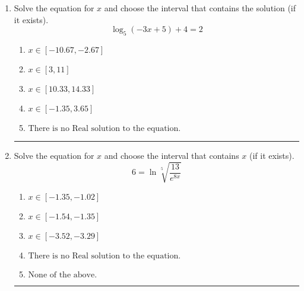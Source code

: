 \documentclass[14pt]{extbook}
\newcommand{\litem}[1]{\item#1\hspace*{-1cm}\rule{\textwidth}{0.4pt}}
\begin{document}
\begin{enumerate}
{\begin{enumerate}[label=\Alph*.]
\end{enumerate} }
\litem{
Solve the equation for $x$ and choose the interval that contains the solution (if it exists).\[ \log_{5}{(-3x+5)}+4 = 2 \]\begin{enumerate}[label=\Alph*.]
\item \( x \in [-10.67, -2.67] \)
\item \( x \in [3, 11] \)
\item \( x \in [10.33, 14.33] \)
\item \( x \in [-1.35, 3.65] \)
\item \( \text{There is no Real solution to the equation.} \)

\end{enumerate} }
\litem{
 Solve the equation for $x$ and choose the interval that contains $x$ (if it exists).\[  6 = \ln{\sqrt[5]{\frac{13}{e^{8x}}}} \]\begin{enumerate}[label=\Alph*.]
\item \( x \in [-1.35, -1.02] \)
\item \( x \in [-1.54, -1.35] \)
\item \( x \in [-3.52, -3.29] \)
\item \( \text{There is no Real solution to the equation.} \)
\item \( \text{None of the above.} \)

\end{enumerate} }
\end{enumerate}
\end{document}
